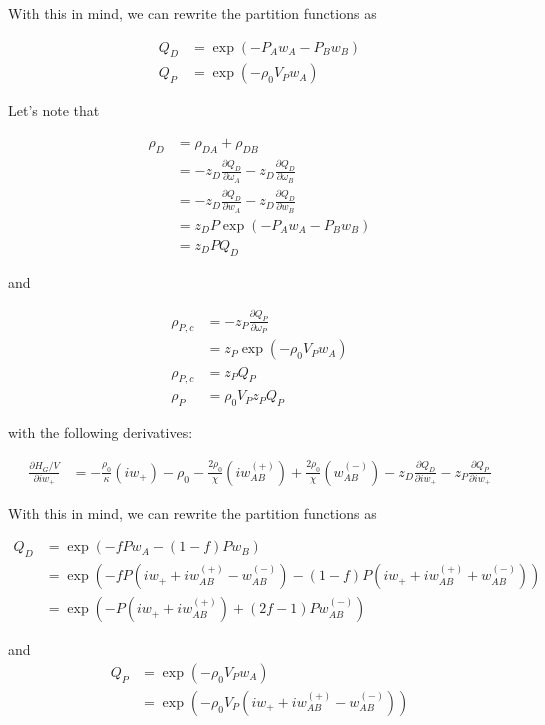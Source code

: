 \documentclass{article}
\begin{document}
With this in mind, we can rewrite the partition functions as

\begin{align*}
  Q_D &= \exp(-P_A w_A - P_B w_B) \\
  Q_P &= \exp(-\rho_0 V_P w_A)
\end{align*}

Let's note that

\begin{align*}
  \rho_D &= \rho_{DA} + \rho_{DB} \\
  &= -z_D \frac{\partial Q_D}{\partial \omega_A}
     -z_D \frac{\partial Q_D}{\partial \omega_B} \\
  &= -z_D \frac{\partial Q_D}{\partial w_A}
     -z_D \frac{\partial Q_D}{\partial w_B} \\
  &= z_D P \exp(-P_A w_A - P_B w_B) \\
  &= z_D P Q_D
\end{align*}

and

\begin{align*}
  \rho_{P,c} &= -z_P \frac{\partial Q_P}{\partial \omega_P} \\
  &= z_P \exp(-\rho_0 V_P w_A) \\
  \rho_{P,c} &= z_P Q_P \\
  \rho_P &= \rho_0 V_P z_P Q_P
\end{align*}

with the following derivatives:

\begin{align*}
  \frac{\partial H_G/V}{\partial iw_+} &=
  - \frac{\rho_0}{\kappa} (iw_+)
  - \rho_0
  - \frac{2 \rho_0}{\chi} (iw_{AB}^{(+)})
  + \frac{2 \rho_0}{\chi} (w_{AB}^{(-)})
  - z_D \frac{\partial Q_D}{\partial iw_+}
  - z_P \frac{\partial Q_P}{\partial iw_+}
\end{align*}

With this in mind, we can rewrite the partition functions as

\begin{align*}
  Q_D &= \exp(-f P w_A - (1-f) P w_B) \\
  &= \exp(-f P (iw_+ + iw_{AB}^{(+)} - w_{AB}^{(-)})
          - (1-f) P (iw_+ + iw_{AB}^{(+)} + w_{AB}^{(-)})
         ) \\
  &= \exp(-P(iw_+ + iw_{AB}^{(+)}) + (2f-1)P w_{AB}^{(-)})
\end{align*}

and \begin{align*}
  Q_P &= \exp(-\rho_0 V_P w_A) \\
      &= \exp(-\rho_0 V_P (iw_+ + iw_{AB}^{(+)} - w_{AB}^{(-)}))
\end{align*}
\end{document}
